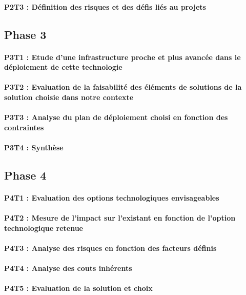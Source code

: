 \paragraph{P2T3 : Définition des risques et des défis liés au projets}

\subsection{Phase 3}
\paragraph{P3T1 : Etude d'une infrastructure proche et plus avancée dans le déploiement de cette technologie}
\paragraph{P3T2 : Evaluation de la faisabilité des éléments de solutions de la solution choisie dans notre contexte}
\paragraph{P3T3 : Analyse du plan de déploiement choisi en fonction des contraintes}
\paragraph{P3T4 : Synthèse}

\subsection{Phase 4}
\paragraph{P4T1 : Evaluation des options technologiques envisageables}
\paragraph{P4T2 : Mesure de l'impact sur l'existant en fonction de l'option technologique retenue}
\paragraph{P4T3 : Analyse des risques en fonction des facteurs définis}
\paragraph{P4T4 : Analyse des couts inhérents}
\paragraph{P4T5 : Evaluation de la solution et choix}

